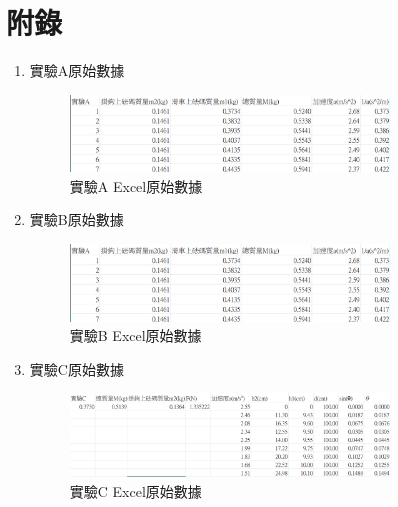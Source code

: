 \documentclass[11pt,a4paper]{article}
\theoremstyle{definition}
\begin{document}
    \section*{附錄}
        \begin{enumerate}
            \item 實驗A原始數據
            \begin{figure}[H]
                
                \centering
                \includegraphics[width=0.8\textwidth]{實驗A原始數據.png}
                \caption{實驗A Excel原始數據}
                \label{fig:實驗A Excel原始數據}

            \end{figure} 
            \item 實驗B原始數據
            \begin{figure}[H]
                
                \centering
                \includegraphics[width=0.8\textwidth]{實驗B原始數據.png}
                \caption{實驗B Excel原始數據}
                \label{fig:實驗B Excel原始數據}

            \end{figure}
            \item 實驗C原始數據
            \begin{figure}[H]
                
                \centering
                \includegraphics[width=0.8\textwidth]{實驗C原始數據.png}
                \caption{實驗C Excel原始數據}
                \label{fig:實驗C Excel原始數據}

            \end{figure} 
        \end{enumerate}
\end{document}
